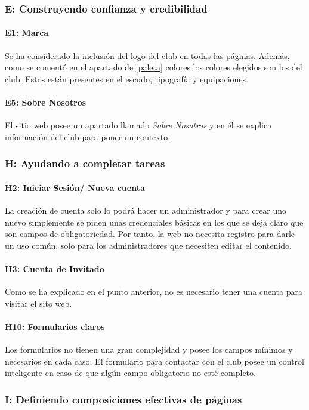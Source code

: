 \documentclass[10pt, spanish, pdftex]{template/UC3M_document}
\begin{document}
\subsubsection{E: Construyendo confianza y credibilidad}
\paragraph{E1: Marca}
  Se ha considerado la inclusión del logo del club en todas las páginas. Además, como se comentó en el apartado de \ref{paleta} colores los colores elegidos son los del club. Estos están presentes en el escudo, tipografía y equipaciones.
\paragraph{E5: Sobre Nosotros}
  El sitio web posee un apartado llamado \textit{Sobre Nosotros} y en él se explica información del club para poner un contexto.

\subsubsection{H: Ayudando a completar tareas}
\paragraph{H2: Iniciar Sesión/ Nueva cuenta}
  La creación de cuenta solo lo podrá hacer un administrador y para crear uno nuevo simplemente se piden unas credenciales básicas en los que se deja claro que son campos de obligatoriedad.
  Por tanto, la web no necesita registro para darle un uso común, solo para los administradores que necesiten editar el contenido.
\paragraph{H3: Cuenta de Invitado}
  Como se ha explicado en el punto anterior, no es necesario tener una cuenta para visitar el sito web.
\paragraph{H10: Formularios claros}
  Los formularios no tienen una gran complejidad y posee los campos mínimos y necesarios en cada caso. El formulario para contactar con el club posee un control inteligente en caso de que algún campo obligatorio no esté completo.

\subsubsection{I: Definiendo composiciones efectivas de páginas}
\end{document}
